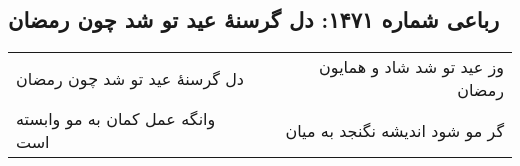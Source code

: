 \begin{center}
\section*{رباعی شماره ۱۴۷۱: دل گرسنهٔ عید تو شد چون رمضان}
\label{sec:1471}
\begin{longtable}{l p{0.5cm} r}
دل گرسنهٔ عید تو شد چون رمضان
&&
وز عید تو شد شاد و همایون رمضان
\\
وانگه عمل کمان به مو وابسته است
&&
گر مو شود اندیشه نگنجد به میان
\\
\end{longtable}
\end{center}
